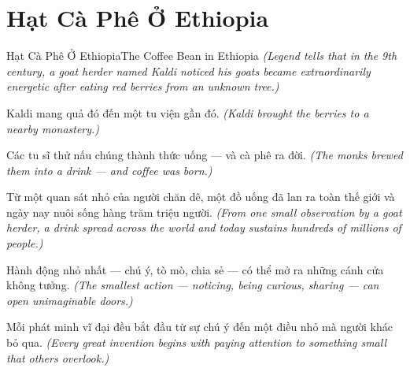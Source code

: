 \section{Hạt Cà Phê Ở Ethiopia}
\begin{truyen}{Hạt Cà Phê Ở Ethiopia}{The Coffee Bean in Ethiopia}
\textit{(Legend tells that in the 9th century, a goat herder named Kaldi noticed his goats became extraordinarily energetic after eating red berries from an unknown tree.)}

Kaldi mang quả đó đến một tu viện gần đó.
\textit{(Kaldi brought the berries to a nearby monastery.)}

Các tu sĩ thử nấu chúng thành thức uống — và cà phê ra đời.
\textit{(The monks brewed them into a drink — and coffee was born.)}

Từ một quan sát nhỏ của người chăn dê, một đồ uống đã lan ra toàn thế giới và ngày nay nuôi sống hàng trăm triệu người.
\textit{(From one small observation by a goat herder, a drink spread across the world and today sustains hundreds of millions of people.)}

Hành động nhỏ nhất — chú ý, tò mò, chia sẻ — có thể mở ra những cánh cửa không tưởng.
\textit{(The smallest action — noticing, being curious, sharing — can open unimaginable doors.)}

\end{truyen}

\begin{baihoc}
Mỗi phát minh vĩ đại đều bắt đầu từ sự chú ý đến một điều nhỏ mà người khác bỏ qua.
\textit{(Every great invention begins with paying attention to something small that others overlook.)}
\end{baihoc}
\ngancach


